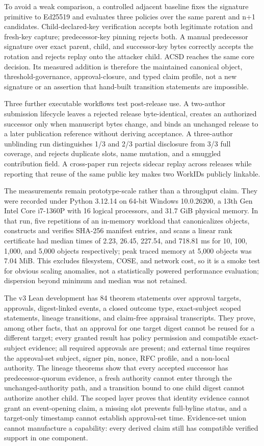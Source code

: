 \documentclass[11pt]{article}
\begin{document}
To avoid a weak comparison, a controlled adjacent baseline fixes the signature
primitive to Ed25519 and evaluates three policies over the same parent and
n+1 candidates. Child-declared-key verification accepts both legitimate
rotation and fresh-key capture; predecessor-key pinning rejects both. A manual
predecessor signature over exact parent, child, and successor-key bytes
correctly accepts the rotation and rejects replay onto the attacker child.
ACSD reaches the same core decision. Its measured addition is therefore the
maintained canonical object, threshold-governance, approval-closure, and typed
claim profile, not a new signature or an assertion that hand-built transition
statements are impossible.

Three further executable workflows test post-release use. A two-author
submission lifecycle leaves a rejected release byte-identical, creates an
authorized successor only when manuscript bytes change, and binds an unchanged
release to a later publication reference without deriving acceptance. A
three-author unblinding run distinguishes 1/3 and 2/3 partial disclosure from
3/3 full coverage, and rejects duplicate slots, name mutation, and a smuggled
contribution field. A cross-paper run rejects sidecar replay across releases
while reporting that reuse of the same public key makes two WorkIDs publicly
linkable.

The measurements remain prototype-scale rather than a throughput claim. They
were recorded under Python 3.12.14 on 64-bit Windows 10.0.26200, a 13th Gen
Intel Core i7-1360P with 16 logical processors, and 31.7 GiB physical memory.
In that run, five repetitions of an in-memory workload that canonicalizes
objects, constructs and verifies SHA-256 manifest entries, and scans a linear
rank certificate had median times of 2.23, 26.45, 227.54, and 718.81 ms for
10, 100, 1,000, and 5,000 objects respectively; peak traced memory at 5,000
objects was 7.04 MiB. This excludes filesystem, COSE, and network cost, so it
is a smoke test for obvious scaling anomalies, not a statistically powered
performance evaluation; dispersion beyond minimum and median was not retained.

The v3 Lean development has 84 theorem statements over approval targets,
approvals, digest-linked events, a closed outcome type, exact-subject scoped
statements, lineage transitions, and claim-free appraisal transcripts. They
prove, among other facts, that an approval for one target digest cannot be
reused for a different target; every granted result has policy permission and
compatible exact-subject evidence; all required approvals are present; and
external time requires the approval-set subject, signer pin, nonce, RFC profile,
and a non-local authority. The lineage theorems show that every accepted
successor has predecessor-quorum evidence, a fresh authority cannot enter
through the unchanged-authority path, and a transition bound to one child
digest cannot authorize another child. The scoped layer proves that identity
evidence cannot grant an event-opening claim, a missing slot prevents
full-byline status, and a target-only timestamp cannot establish approval-set
time. Evidence-set union cannot manufacture a capability: every derived claim
still has compatible verified support in one component.
\end{document}
